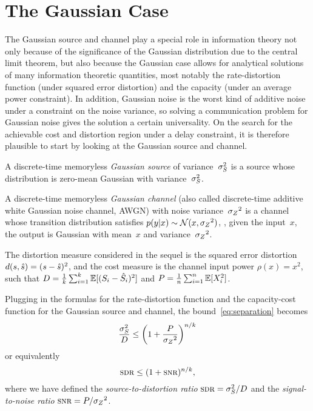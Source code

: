 \section{The Gaussian Case}\label{sec:gaussian}

The Gaussian source and channel play a special role in information theory not
only because of the significance of the Gaussian distribution due to the central
limit theorem, but also because the Gaussian case allows for analytical
solutions of many information theoretic quantities, most notably the
rate-distortion function (under squared error distortion) and the capacity
(under an average power constraint). In addition, Gaussian noise is the worst
kind of additive noise under a constraint on the noise variance, so solving a
communication problem for Gaussian noise gives the solution a certain
universality. On the search for the achievable cost and distortion region under
a delay constraint, it is therefore plausible to start by looking at the
Gaussian source and channel. 

\begin{definition}
  \label{def:gaussiansc}
  A discrete-time memoryless \emph{Gaussian source} of variance~${\sigma_S^2}$ is a
  source whose distribution is zero-mean Gaussian with variance~${\sigma_S^2}$.

  A discrete-time memoryless \emph{Gaussian channel} (also called discrete-time
  additive white Gaussian noise channel, AWGN) with noise variance~${{\sigma_Z}^2}$ is a
  channel whose transition distribution satisfies $p(y|x) \sim \mathcal{N}(x, {{\sigma_Z}^2})$,
  \ie, given the input~$x$, the output is Gaussian with mean~$x$ and
  variance~${{\sigma_Z}^2}$.
\end{definition}

The distortion measure considered in the sequel is the squared error distortion
$d(s,{\hat{s}}) = (s - {\hat{s}})^2$, and the cost measure is the channel input power
$\rho(x) = x^2$, such that $D = \frac1k \sum_{i=1}^k \mathbb{E}[(S_i - {\hat{S}}_i)^2]$ and $P
= \frac1n \sum_{i=1}^n \mathbb{E}[X_i^2]$.

Plugging in the formulas for the rate-distortion function and the capacity-cost
function for the Gaussian source and channel, the bound~\eqref{eq:separation}
becomes
\begin{equation}
  \label{eq:gausssep}
  \frac{{\sigma_S^2}}{D} \le \left( 1 + \frac{P}{{{\sigma_Z}^2}} \right)^{n/k}
\end{equation}
or equivalently
\begin{equation}
  \label{eq:gausssepsdr}
  \sdr \le (1 + \snr)^{n/k},
\end{equation}
where we have defined the \emph{source-to-distortion ratio} $\sdr = \ssq/D$ and
the \emph{signal-to-noise ratio} $\snr = P/\szq$. 


